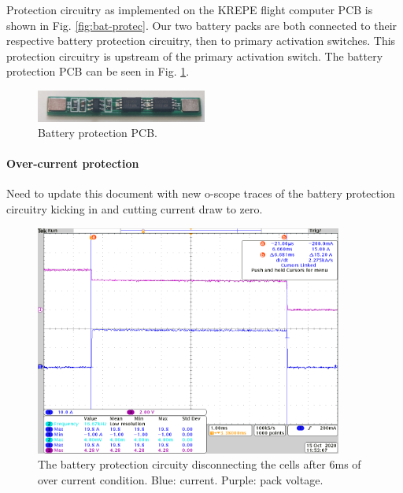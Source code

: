 \documentclass{article}
\begin{document}
Protection circuitry as implemented on the KREPE flight computer PCB is shown in Fig. \ref{fig:bat-protec}. Our two battery packs are both connected to their respective battery protection circuitry, then  to primary activation switches. This protection circuitry is upstream of the primary activation switch. The battery protection PCB can be seen in Fig. \ref{fig:bat-protect}.



\begin{figure}[H]
	\centering
	\includegraphics[width=0.5\textwidth]{images/new_batt_prot.png}
	\caption{Battery protection PCB.}
	\label{fig:bat-protect}
\end{figure}


\paragraph{Over-current protection}
Need to update this document with new o-scope traces of the battery protection circuitry kicking in and cutting current draw to zero.


\begin{figure}[H]
	\centering
	\includegraphics[width=0.9\textwidth]{images/over-current.png}
	\caption{The battery protection circuity disconnecting the cells after 6ms of over current condition. Blue: current. Purple: pack voltage.}
	\label{fig:over-current}
\end{figure}



\end{document}
